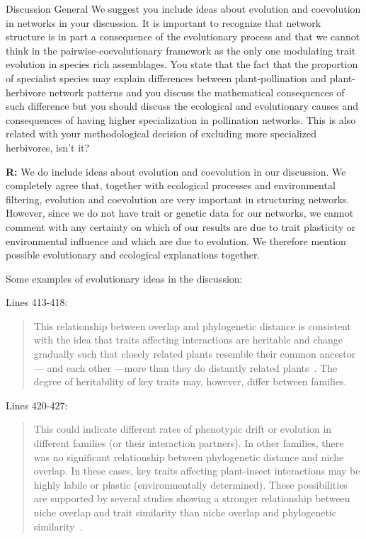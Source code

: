 \documentclass[12pt]{letter}
\newenvironment{refquote}{\bigskip \begin{it}}{\end{it}\smallskip}
\begin{document}
		\begin{refquote}
			Discussion
			General
			We suggest you include ideas about evolution and coevolution in networks in your discussion. It is important to recognize that network structure is in part a consequence of the evolutionary process and that we cannot think in the pairwise-coevolutionary framework as the only one modulating trait evolution in species rich assemblages.
			You state that the fact that the proportion of specialist species may explain differences between plant-pollination and plant-herbivore network patterns and you discuss the mathematical consequences of such difference but you should discuss the ecological and evolutionary causes and consequences of having higher specialization in pollination networks. This is also related with your methodological decision of excluding more specialized herbivores, isn't it?
		\end{refquote}

		\textbf{R:} We do include ideas about evolution and coevolution in our discussion. We completely agree that, together with ecological processes and environmental filtering, evolution and coevolution are very important in structuring networks. However, since we do not have trait or genetic data for our networks, we cannot comment with any certainty on which of our results are due to trait plasticity or environmental influence and which are due to evolution. We therefore mention possible evolutionary and ecological explanations together.


		Some examples of evolutionary ideas in the discussion:


		Lines 413-418:

		\begin{quotation}

			This relationship between overlap and 
			phylogenetic distance is consistent with the idea that traits affecting 
			interactions are heritable and change gradually
			such that closely related plants resemble their common ancestor--- and
			each other ---more than they do distantly related 
			plants~\citep{Schemske1999,Gilbert2015,Ponisio2017}. The degree of 
			heritability of key traits may, however, differ between families.

		\end{quotation}


		Lines 420-427:

		\begin{quotation}

			This could indicate different 
			rates of phenotypic drift or evolution in different families (or their interaction partners). 
			In other families, there was no significant relationship between phylogenetic
			distance and niche overlap. In these cases, key traits affecting 
			plant-insect interactions may be highly labile or plastic (environmentally determined). These possibilities are supported by several studies showing a stronger relationship between niche overlap and trait similarity than niche overlap and phylogenetic similarity~\citep{Junker2015,Ibanez2016,Endara2017}. 

		\end{quotation}
\end{document}
